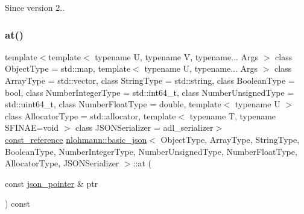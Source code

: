 \begin{DoxySince}{Since}
version 2.. 
\end{DoxySince}
\mbox{\label{classnlohmann_1_1basic__json_a7479d686148c26e252781bb32aa5d5c9}} 
\subsubsection{\texorpdfstring{at()}{at()}\hspace{0.1cm}{\footnotesize\ttfamily [6/6]}}
{\footnotesize\ttfamily template$<$template$<$ typename U, typename V, typename... Args $>$ class Object\+Type = std\+::map, template$<$ typename U, typename... Args $>$ class Array\+Type = std\+::vector, class String\+Type  = std\+::string, class Boolean\+Type  = bool, class Number\+Integer\+Type  = std\+::int64\+\_\+t, class Number\+Unsigned\+Type  = std\+::uint64\+\_\+t, class Number\+Float\+Type  = double, template$<$ typename U $>$ class Allocator\+Type = std\+::allocator, template$<$ typename T, typename S\+F\+I\+N\+A\+E=void $>$ class J\+S\+O\+N\+Serializer = adl\+\_\+serializer$>$ \\
\mbox{\hyperlink{classnlohmann_1_1basic__json_a4057c5425f4faacfe39a8046871786ca}{const\+\_\+reference}} \mbox{\hyperlink{classnlohmann_1_1basic__json}{nlohmann\+::basic\+\_\+json}}$<$ Object\+Type, Array\+Type, String\+Type, Boolean\+Type, Number\+Integer\+Type, Number\+Unsigned\+Type, Number\+Float\+Type, Allocator\+Type, J\+S\+O\+N\+Serializer $>$\+::at (\begin{DoxyParamCaption}\item[{const \mbox{\hyperlink{classnlohmann_1_1basic__json_1_1json__pointer}{json\+\_\+pointer}} \&}]{ptr }\end{DoxyParamCaption}) const\hspace{0.3cm}{\ttfamily [inline]}}



